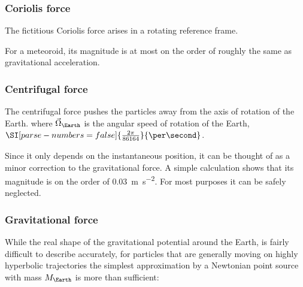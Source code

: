         \subsubsection{Coriolis force} \label{aafC}
            The fictitious Coriolis force arises in a rotating reference frame.

            For a meteoroid, its magnitude is at most on the order of
            roughly the same as gravitational acceleration.

        \subsubsection{Centrifugal force} \label{aafc}
            The centrifugal force pushes the particles away from the axis of rotation of the Earth.
            where $\vec{\Omega}_\Earth$ is the angular speed of rotation of the Earth, $\SI[parse-numbers = false]{\frac{2\pi}{86164}}{\per\second}$.

            Since it only depends on the instantaneous position, it can be thought of as a minor correction to the
            gravitational force. A simple calculation shows that its magnitude is on the order
            of \SI{0.03}{\metre\per\second\squared}. For most purposes it can be safely neglected.

        \subsubsection{Gravitational force} \label{aafg}
            While the real shape of the gravitational potential around the Earth,
            is fairly difficult to describe accurately, for particles that are generally moving
            on highly hyperbolic trajectories the simplest approximation by a Newtonian point source
            with mass $M_\Earth$ is more than sufficient:

